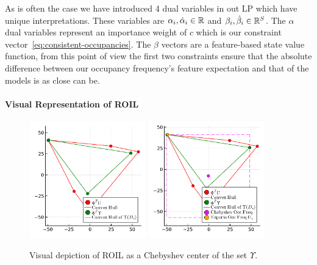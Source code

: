 \documentclass[10pt]{article}
\begin{document}
As is often the case we have introduced 4 dual variables in out LP which have unique interpretations. These variables are $\alpha_i, \hat{\alpha}_i \in \mathbb{R}$ and $\beta_i, \hat{\beta}_i \in \mathbb{R}^S$. The $\alpha$ dual variables represent an importance weight of $c$ which is our constraint vector~\ref{eq:consistent-occupancies}. The $\beta$ vectors are a feature-based state value function, from this point of view the first two constraints ensure that the absolute difference between our occupancy frequency's feature expectation and that of the models is as close can be.

\paragraph{Visual Representation of ROIL}

\begin{figure}
    \centering
    \includegraphics[width=0.45\textwidth]{../notebooks/plots/visual_U_and_Upsilon.pdf}
    \includegraphics[width=0.45\textwidth]{../notebooks/plots/visual_solve_cheb.pdf}
    \caption{Visual depiction of ROIL as a Chebyshev center of the set $\Upsilon$.}
    \label{fig:visual_representation_of_ROIL}
\end{figure}
\end{document}
